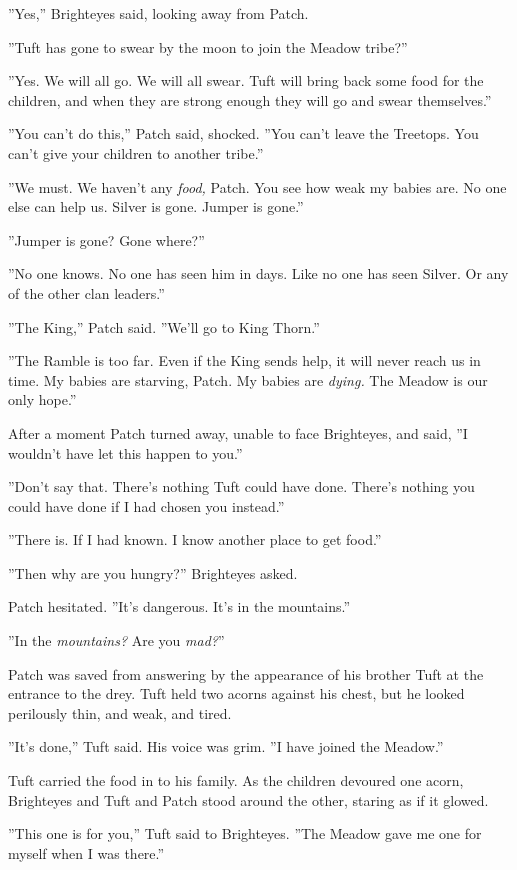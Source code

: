 \documentclass[12pt]{book}
\begin{document}
''Yes,'' Brighteyes said, looking away from Patch.

''Tuft has gone to swear by the moon to join the Meadow tribe?''

''Yes. We will all go. We will all swear. Tuft will bring back some
food for the children, and when they are strong enough they will go
and swear themselves.''

''You can't do this,'' Patch said, shocked. ''You can't leave the
Treetops. You can't give your children to another tribe.''

''We must. We haven't any \textit{food,} Patch. You see how weak my
babies are. No one else can help us. Silver is gone. Jumper is gone.''

''Jumper is gone? Gone where?''

''No one knows. No one has seen him in days. Like no one has seen
Silver. Or any of the other clan leaders.''

''The King,'' Patch said. ''We'll go to King Thorn.''

''The Ramble is too far. Even if the King sends help, it will never
reach us in time. My babies are starving, Patch. My babies are
\textit{dying.} The Meadow is our only hope.''

After a moment Patch turned away, unable to face Brighteyes, and said,
''I wouldn't have let this happen to you.''

''Don't say that. There's nothing Tuft could have done. There's
nothing you could have done if I had chosen you instead.''

''There is. If I had known. I know another place to get food.''

''Then why are you hungry?'' Brighteyes asked.

Patch hesitated. ''It's dangerous. It's in the mountains.''

''In the \textit{mountains?} Are you \textit{mad?}''

Patch was saved from answering by the appearance of his brother Tuft
at the entrance to the drey. Tuft held two acorns against his chest,
but he looked perilously thin, and weak, and tired.

''It's done,'' Tuft said. His voice was grim. ''I have joined the
Meadow.''

Tuft carried the food in to his family. As the children devoured one
acorn, Brighteyes and Tuft and Patch stood around the other, staring
as if it glowed.

''This one is for you,'' Tuft said to Brighteyes. ''The Meadow gave me
one for myself when I was there.''
\end{document}
